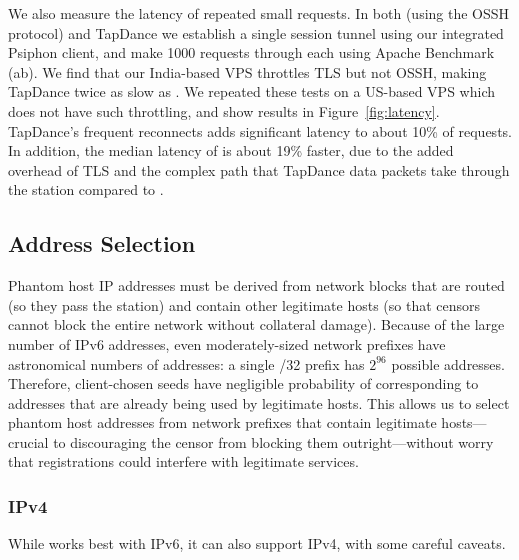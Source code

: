 \documentclass[sigconf]{acmart}
\begin{document}
We also measure the latency of repeated small requests. In both \scheme (using
the OSSH protocol) and
TapDance we establish a single session tunnel using our integrated Psiphon
client, and make 1000 requests through each using Apache Benchmark (ab). We find
that our India-based VPS throttles TLS but not OSSH, making TapDance twice as slow as
\scheme. We repeated these tests on a US-based VPS which does not have such
throttling, and show results in Figure~\ref{fig:latency}. TapDance's frequent
reconnects adds significant latency to about 10\% of requests. In addition, the
median latency of \scheme is about 19\% faster, due to the added
overhead of TLS and the complex path that TapDance data packets take through
the station compared to \scheme.

\FigLatency


\subsection{Address Selection}
\label{sec:addr-selection}

Phantom host IP addresses must be derived from network blocks that are routed (so they pass
the \scheme station) and contain other legitimate hosts (so that censors cannot
block the entire network without collateral damage).
Because of the large number of IPv6 addresses, even
moderately-sized network prefixes have astronomical numbers of addresses: a
single /32 prefix has $2^{96}$ possible addresses. Therefore, client-chosen
seeds have negligible probability of corresponding to addresses that are already
being used by legitimate hosts. This allows us to select phantom host addresses
from network prefixes that contain
legitimate hosts---crucial to discouraging the censor from blocking them
outright---without worry that registrations could interfere with legitimate
services.


\subsubsection{IPv4}
While \scheme works best with IPv6, it can also support IPv4, with some
careful caveats.
\end{document}
